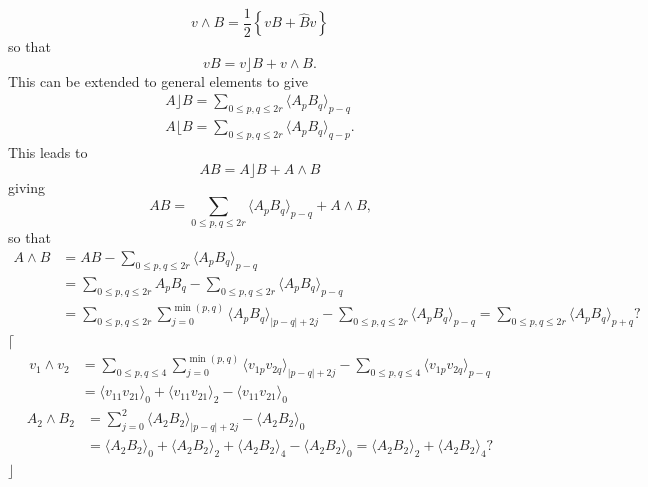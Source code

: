 \documentclass[aps, preprint]{revtex4}
\begin{document}
\begin{equation}v \wedge B =\frac{1}{2} \left \{v B +\hat{B} v\right \}
\end{equation}so that
\begin{equation}v B =v\rfloor B +v \wedge B\text{.}
\end{equation}This can be extended to general elements to give
\begin{align}A\rfloor B =\sum _{0 \leq p ,q \leq 2 r} \langle A_{p} B_{q} \rangle _{p -q} \\
A\lfloor B =\sum _{0 \leq p ,q \leq 2 r} \langle A_{p} B_{q} \rangle _{q -p}\text{.}\end{align}This leads to
\begin{equation}A B =A\rfloor B +A \wedge B
\end{equation}giving
\begin{equation}A B =\sum _{0 \leq p ,q \leq 2 r} \langle A_{p} B_{q} \rangle _{p -q} +A \wedge B\text{,}
\end{equation}so that
\begin{align}A \wedge B &  =A B -\sum _{0 \leq p ,q \leq 2 r} \langle A_{p} B_{q} \rangle _{p -q} \\
 &  =\sum _{0 \leq p ,q \leq 2 r}A_{p} B_{q} -\sum _{0 \leq p ,q \leq 2 r} \langle A_{p} B_{q} \rangle _{p -q} \\
 &  =\sum _{0 \leq p ,q \leq 2 r}\sum _{j =0}^{\min \left (p ,q\right )} \langle A_{p} B_{q} \rangle _{\left \vert p -q\right \vert  +2 j} -\sum _{0 \leq p ,q \leq 2 r} \langle A_{p} B_{q} \rangle _{p -q} =\sum _{0 \leq p ,q \leq 2 r} \langle A_{p} B_{q} \rangle _{p +q}\text{?}\end{align}$\lceil $
\begin{align}v_{1} \wedge v_{2} &  =\sum _{0 \leq p ,q \leq 4}\sum _{j =0}^{\min \left (p ,q\right )} \langle v_{1 p} v_{2 q} \rangle _{\left \vert p -q\right \vert  +2 j} -\sum _{0 \leq p ,q \leq 4} \langle v_{1 p} v_{2 q} \rangle _{p -q} \\
 &  = \langle v_{1 1} v_{2 1} \rangle _{0} + \langle v_{1 1} v_{2 1} \rangle _{2} - \langle v_{1 1} v_{2 1} \rangle _{0}\end{align}
\begin{align}A_{2} \wedge B_{2} &  =\sum _{j =0}^{2} \langle A_{2} B_{2} \rangle _{\left \vert p -q\right \vert  +2 j} - \langle A_{2} B_{2} \rangle _{0} \\
 &  = \langle A_{2} B_{2} \rangle _{0} + \langle A_{2} B_{2} \rangle _{2} + \langle A_{2} B_{2} \rangle _{4} - \langle A_{2} B_{2} \rangle _{0} = \langle A_{2} B_{2} \rangle _{2} + \langle A_{2} B_{2} \rangle _{4}\text{?}\end{align}$\rfloor $ 
\end{document}
